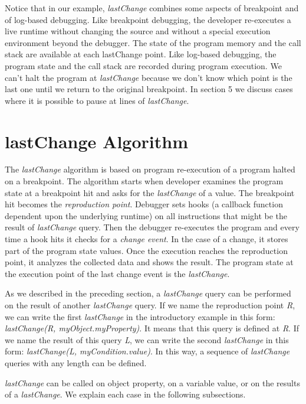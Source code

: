 \documentclass{sig-alternate}
\begin{document}
Notice that in our example, \textit{lastChange} combines some aspects
of breakpoint and of log-based debugging. Like breakpoint debugging,
the developer re-executes a live runtime without changing the source
and without a special execution environment beyond the debugger. The
state of the program memory and the call stack are available at each
lastChange point. Like log-based debugging, the program state and the
call stack are recorded during program execution. We can't halt the
program at \textit{lastChange} because we don't know which point is the last
one until we return to the original breakpoint. In section 5 we
discuss cases where it is possible to pause at lines of \textit{lastChange}.


\section{lastChange Algorithm}

The \textit{lastChange} algorithm is based on program re-execution of
a program halted on a breakpoint. The algorithm starts when developer
examines the program state at a breakpoint hit and asks for the
\textit{lastChange} of a value. The breakpoint hit becomes the
\textit{reproduction point}. Debugger sets hooks (a callback
function dependent upon the underlying runtime) on all instructions
that might be the result of \textit{lastChange} query. Then the
debugger re-executes the program and every time a hook hits it
checks for a \textit{change event}. In the case of a change, it stores
part of the program state values.  Once the execution reaches the
reproduction point, it analyzes the collected data and shows the
result.  The program state at the execution point of the last change
event is the \textit{lastChange}.


As we described in the preceding section, a \textit{lastChange} query can
be performed on the result of another \textit{lastChange} query. If we
name the reproduction point \textit{R}, we can write the first
\textit{lastChange} in the introductory example in this form:
\textit{lastChange(R, myObject.myProperty)}. It means that this query
is defined at \textit{R}. If we name the result of this query
\textit{L}, we can write the second \textit{lastChange} in this form:
\textit{lastChange(L, myCondition.value)}. In this way, a sequence of
\textit{lastChange} queries with any length can be defined. 

\textit{lastChange} can be called on object property, on a variable value, 
or on the results of a \textit{lastChange}. We explain each case in the following subsections.
\end{document}
